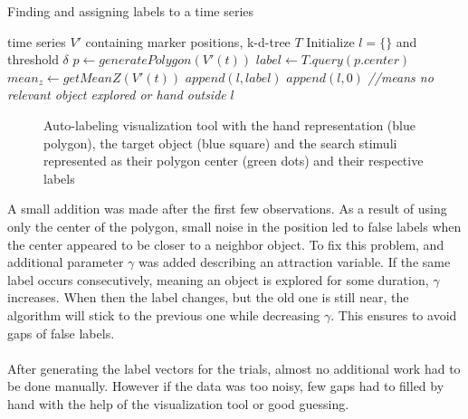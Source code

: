 \begin{algorithm}
	\caption{Finding and assigning labels to a time series}
	\label{label-gen}
	 \begin{algorithmic}[1]
	 	\Require time series $ V' $ containing marker positions,  k-d-tree $ T $
	 	\Begin 
	 	\State Initialize $l = \{\} $ and threshold $ \delta $ 
	 	\State $ p \leftarrow generatePolygon(V'(t)) $
	 	\State $ label \leftarrow T.query(p.center) $
	 	\State $ mean_z \leftarrow getMeanZ(V'(t)) $
	 	 \State $ append(l,label)$ \Else
	 	\State $ append(l,0)$ \textit{ //means no relevant object explored or hand outside} \EndIf
	 	\EndFor
	 	\State \Return $ l $
	 	\End
	 \end{algorithmic}
\end{algorithm}

\begin{figure}[h]
	\caption{Auto-labeling visualization tool with the hand representation (blue polygon), the target object (blue square) and the search stimuli represented as their polygon center (green dots) and their respective labels}
	\label{auto_label}
\end{figure}

A small addition was made after the first few observations. As a result of using only the center of the polygon, small noise in the position led to false labels when the center appeared to be closer to a neighbor object. To fix this problem, and additional parameter $ \gamma $ was added describing an attraction variable. If the same label occurs consecutively, meaning an object is explored for some duration, $ \gamma $ increases. When then the label changes, but the old one is still near, the algorithm will stick to the previous one while decreasing $ \gamma $. This ensures to avoid gaps of false labels.\\
\\
After generating the label vectors for the trials, almost no additional work had to be done manually. However if the data was too noisy, few gaps had to filled by hand with the help of the visualization tool or good guessing.


